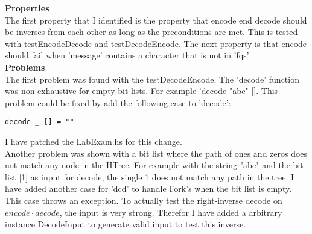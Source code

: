 \noindent
\textbf{Properties} \\
The first property that I identified is the property that encode end decode should be inverses from each other as long as the preconditions are met. This is tested with testEncodeDecode and testDecodeEncode.
The next property is that encode should fail when 'message' contains a character that is not in 'fqs'. \\

\noindent
\textbf{Problems} \\
The first problem was found with the testDecodeEncode. The 'decode' function was non-exhaustive for empty bit-lists. For example 'decode "abc" [].
This problem could be fixed by add the following case to 'decode': \\

\begin{lstlisting}
decode _ [] = ""
\end{lstlisting}

\noindent
I have patched the LabExam.hs for this change. \\

\noindent
Another problem was shown with a bit list where the path of ones and zeros does not match any node in the HTree.
For example with the string "abc" and the bit list [1] as input for decode, the single 1 does not match any path in the tree.
I have added another case for 'dcd' to handle Fork's when the bit list is empty. This case throws an exception.
To actually test the right-inverse decode on $encode \cdot decode$, the input is very strong. Therefor I have added a arbitrary instance DecodeInput to generate valid input to test this inverse.


